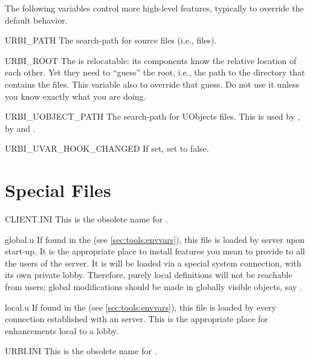 The following variables control more high-level features, typically to
override the default behavior.
\begin{envs}
\item[URBI\_PATH] The search-path for \us source files (i.e.,
   files).

\item[URBI\_ROOT] The \usdk is relocatable: its components know the
  relative location of each other.  Yet they need to ``guess'' the
  \urbi root, i.e., the path to the directory that contains the files.
  This variable also to override that guess.  Do not use it unless you
  know exactly what you are doing.

\item[URBI\_UOBJECT\_PATH] The search-path for UObjects files.
  This is used by , by
   and .

\item[URBI\_UVAR\_HOOK\_CHANGED] If set, set  to
  false.
\end{envs}

\section{Special Files}
\label{sec:tools:files}

\begin{files}
\item[CLIENT.INI] This is the obsolete name for .

\item[global.u] If found in the  (see
  \autoref{sec:tools:envvars}), this file is loaded by \urbi server upon
  start-up.  It is the appropriate place to install features you
  mean to provide to all the users of the server.  It is will be
  loaded via a special system connection, with its own private lobby.
  Therefore, purely local definitions will not be reachable from
  users; global modifications should be made in globally visible
  objects, say .

\item[local.u] If found in the  (see
  \autoref{sec:tools:envvars}), this file is loaded by every
  connection established with an \urbi server.  This is the
  appropriate place for enhancements local to a lobby.

\item[URBI.INI] This is the obsolete name for .
\end{files}

